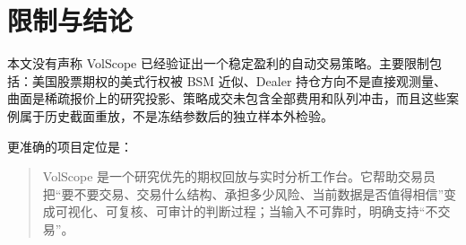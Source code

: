 \documentclass[UTF8,a4paper,11pt]{ctexart}
\begin{document}
\section{限制与结论}

本文没有声称 VolScope 已经验证出一个稳定盈利的自动交易策略。主要限制包括：美国股票期权的美式行权被 BSM 近似、Dealer 持仓方向不是直接观测量、曲面是稀疏报价上的研究投影、策略成交未包含全部费用和队列冲击，而且这些案例属于历史截面重放，不是冻结参数后的独立样本外检验。

更准确的项目定位是：

\begin{quote}
VolScope 是一个研究优先的期权回放与实时分析工作台。它帮助交易员把“要不要交易、交易什么结构、承担多少风险、当前数据是否值得相信”变成可视化、可复核、可审计的判断过程；当输入不可靠时，明确支持“不交易”。
\end{quote}
\end{document}
